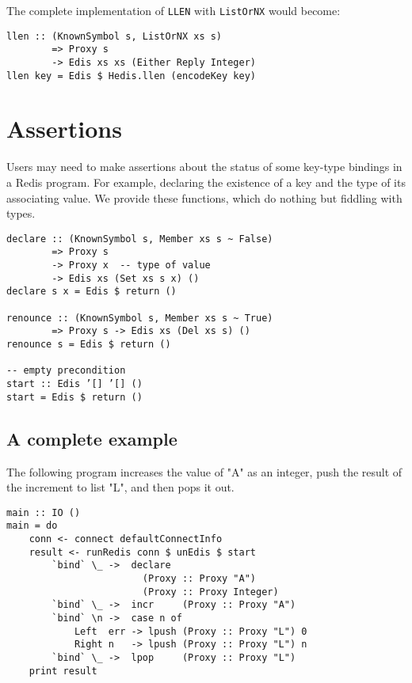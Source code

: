 \documentclass[pldi]{sigplanconf-pldi16}
\begin{document}
The complete implementation of \texttt{LLEN} with
\texttt{ListOrNX} would become:

\begin{verbatim}
llen :: (KnownSymbol s, ListOrNX xs s)
        => Proxy s
        -> Edis xs xs (Either Reply Integer)
llen key = Edis $ Hedis.llen (encodeKey key)
\end{verbatim}

\section{Assertions}

Users may need to make assertions about the status of some key-type bindings in
 a Redis program. For example, declaring the existence of a key and the type
 of its associating value. We provide these functions, which do nothing but
 fiddling with types.

\begin{verbatim}
declare :: (KnownSymbol s, Member xs s ~ False)
        => Proxy s
        -> Proxy x  -- type of value
        -> Edis xs (Set xs s x) ()
declare s x = Edis $ return ()

renounce :: (KnownSymbol s, Member xs s ~ True)
        => Proxy s -> Edis xs (Del xs s) ()
renounce s = Edis $ return ()

-- empty precondition
start :: Edis ’[] ’[] ()
start = Edis $ return ()
\end{verbatim}

\subsection{A complete example}

The following program increases the value of "A" as an integer, push the result
 of the increment to list "L", and then pops it out.

\begin{verbatim}
main :: IO ()
main = do
    conn <- connect defaultConnectInfo
    result <- runRedis conn $ unEdis $ start
        `bind` \_ ->  declare
                        (Proxy :: Proxy "A")
                        (Proxy :: Proxy Integer)
        `bind` \_ ->  incr     (Proxy :: Proxy "A")
        `bind` \n ->  case n of
            Left  err -> lpush (Proxy :: Proxy "L") 0
            Right n   -> lpush (Proxy :: Proxy "L") n
        `bind` \_ ->  lpop     (Proxy :: Proxy "L")
    print result
\end{verbatim}
\end{document}

